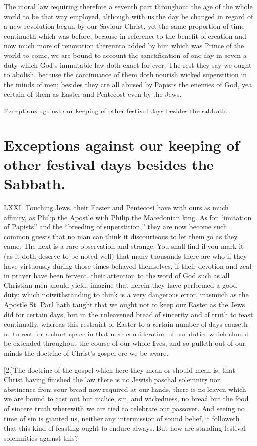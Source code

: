 The moral law requiring therefore a seventh part throughout the age of the whole world to be that way employed, although with us the day be changed in regard of a new revolution begun by our Saviour Christ, yet the same proportion of time continueth which was before, because in reference to the benefit of creation and now much more of renovation thereunto added by him which was Prince of the world to come, we are bound to account the sanctification of one day in seven a duty which God’s immutable law doth exact for ever. The rest they say we ought to abolish, because the continuance of them doth nourish wicked superstition in the minds of men;  besides they are all abused by Papists the enemies of God, yea certain of them as Easter and Pentecost even by the Jews.


Exceptions against our keeping of other festival days besides the sabboth.
\section*{Exceptions against our keeping of other festival days besides the Sabbath.}
LXXI. Touching Jews, their Easter and Pentecost have with ours as much affinity, as Philip the Apostle with Philip the Macedonian king. As for “imitation of Papists” and the “breeding of superstition,” they are now become such common guests that no man can think it discourteous to let them go as they came. The next is a rare observation and strange. You shall find if you mark it (as it doth deserve to be noted well) that many thousands there are who if they have virtuously during those times behaved themselves, if their devotion and zeal in prayer have been fervent, their attention to the word of God such as all Christian men should yield, imagine that herein they have performed a good duty; which notwithstanding to think is a very dangerous error, inasmuch as the Apostle St. Paul hath taught that we ought  not to keep our Easter as the Jews did for certain days,
 but in the unleavened bread of sincerity and of truth to feast continually, whereas this restraint of Easter to a certain number of days causeth us to rest for a short space in that near consideration of our duties which should be extended throughout the course of our whole lives, and so pulleth out of our minds the doctrine of Christ’s gospel ere we be aware.

[2.]The doctrine of the gospel which here they mean or should mean is, that Christ having finished the law there is no Jewish paschal solemnity nor abstinence from sour bread now required at our hands, there is no leaven which we are bound to cast out but malice, sin, and wickedness, no bread but the food of sincere truth wherewith we are tied to celebrate our passover. And seeing no time of sin is granted us, neither any intermission of sound belief, it followeth that this kind of feasting ought to endure always. But how are standing festival solemnities against this?

